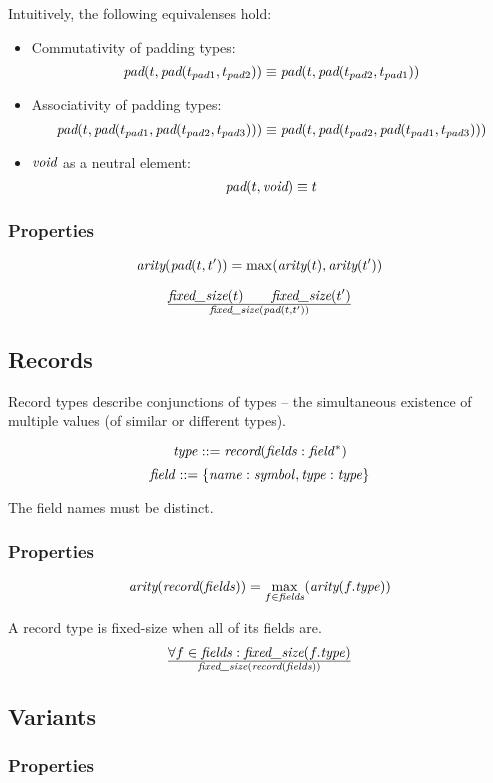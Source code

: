 \documentclass[a4paper]{report}
\newcommand\arity{{\ensuremath\textit{arity}}}
\newcommand\fixedsize{{\ensuremath\textit{fixed\_size}}}
\newcommand\tyPad{{\ensuremath\textit{pad}}}
\newcommand\tyRecord{{\ensuremath\textit{record}}}
\newcommand\tyVoid{{\ensuremath\textit{void}}}
\begin{document}
\noindent
Intuitively, the following equivalenses hold:

\begin{itemize}
\item Commutativity of padding types:
$$\tyPad(t, \tyPad(t_{pad1}, t_{pad2})) \equiv
  \tyPad(t, \tyPad(t_{pad2}, t_{pad1}))$$

\item Associativity of padding types:
$$\tyPad(t, \tyPad(t_{pad1}, \tyPad(t_{pad2}, t_{pad3}))) \equiv
\tyPad(t, \tyPad(t_{pad2}, \tyPad(t_{pad1}, t_{pad3})))$$

\item $\tyVoid$ as a neutral element:
$$\tyPad(t, \tyVoid) \equiv t$$

\end{itemize}

\subsubsection*{Properties}
$$ \arity(\tyPad(t, t')) = \max(\arity(t), \arity(t'))$$


$${\fixedsize(t) \qquad \fixedsize(t')}
 \over
\fixedsize(\tyPad(t, t'))$$

\subsection{Records}
Record types describe conjunctions of types -- the simultaneous
existence of multiple values (of similar or different types).

$$\it type ::= \tyRecord(fields : field^*)$$
$$\it field ::= \{name:symbol, type:type\}$$

The field names must be distinct.

\subsubsection*{Properties}

$$
\arity(\tyRecord({\it fields})) = \max_{f \in {\it fields}}(\arity(f.{\it type}))
$$


A record type is fixed-size when all of its fields are.
$${\forall f \in {\it fields} : \fixedsize(f.{\it type})} \over
  \fixedsize(\tyRecord({\it fields}))
$$

\subsection{Variants}
\subsubsection*{Properties}
\end{document}
